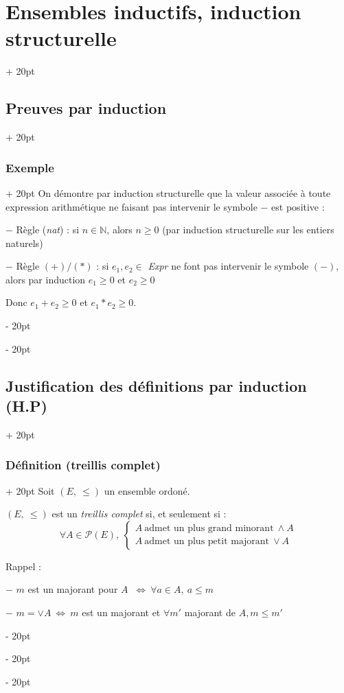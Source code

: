 \documentclass[a4paper, 12pt, twoside]{article}
\newcommand{\N}{\mathbb{N}} %
\newcommand{\ssi}{\ \Leftrightarrow \ }
\newcommand{\eqsys}[2]{\begin{cases} #1 \\ #2 \end{cases}}
\renewcommand{\le}{\leqslant}
\renewcommand{\ge}{\geqslant}
\newcommand{\ind}[1][20pt]{\advance\leftskip + #1}
\newcommand{\deind}[1][20pt]{\advance\leftskip - #1}
\newenvironment{indt}[2][20pt]{#2 \par \ind[#1]}{\par \deind} %
\begin{document}
\begin{indt}{\section{Ensembles inductifs, induction structurelle}}
\begin{indt}{\subsection{Preuves par induction}}
\begin{indt}{\subsubsection{Exemple}}
                On démontre par induction structurelle que la valeur associée à toute expression arithmétique ne faisant pas intervenir le symbole $-$ est positive :
                
                $-$ Règle (\textsl{nat}) : si $n \in \N$, alors $n \ge 0$ (par induction structurelle sur les entiers naturels)
                
                $-$ Règle $(+) / (*)$ : si $e_1, e_2 \in $ \textsl{Expr} ne font pas intervenir le symbole $(-)$, alors par induction $e_1 \ge 0$ et $e_2 \ge 0$
                
                Donc $e_1 + e_2 \ge 0$  et $e_1 * e_2 \ge 0$.
            \end{indt}
        \end{indt}
            
        \vspace{12pt}
        
        \begin{indt}{\subsection{Justification des définitions par induction (H.P)}}
            \begin{indt}{\subsubsection{Définition (treillis complet)}}
                Soit $(E,\ \le)$ un ensemble ordoné.
                
                $(E, \ \le)$ est un \textit{treillis complet} si, et seulement si :
                    \[
                        \forall A \in \mathcal P(E),\
                        \eqsys
                            {A\ \text{admet un plus grand minorant}\ \wedge A}
                            {A\ \text{admet un plus petit majorant}\ \vee A}
                    \]
                
                Rappel :
                
                $-$ $m$ est un majorant pour $A$ $\ssi \forall a \in A,\ a \le m$
                
                $-$ $m = \vee A \ssi m$ est un majorant et $\forall m'$ majorant de $A, m \le m'$
            \end{indt}
            
            \vspace{12pt}
            

\end{indt}
\end{indt}
\end{document}
